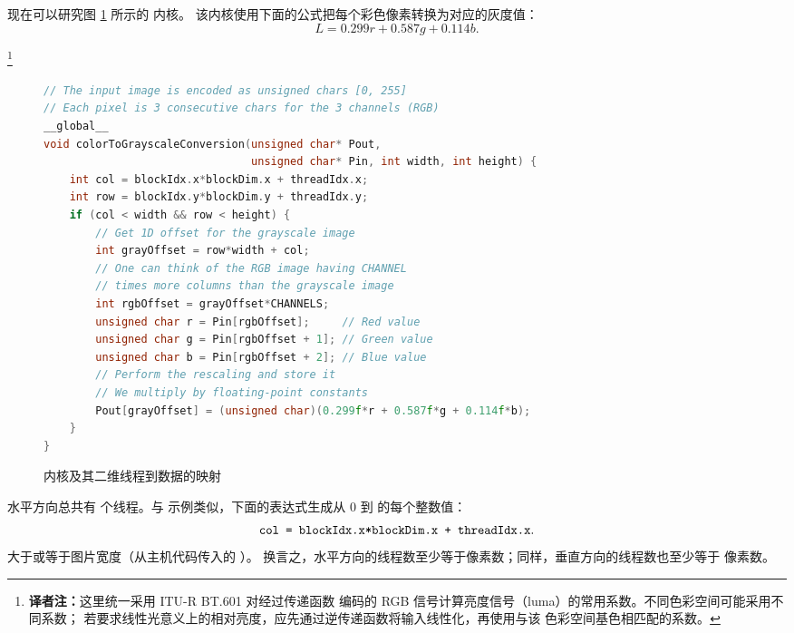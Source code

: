 现在可以研究图 \ref{fig:3-4} 所示的  内核。
该内核使用下面的公式把每个彩色像素转换为对应的灰度值：
\[
  L = 0.299r + 0.587g + 0.114b.
\]

\footnote{\noindent\textbf{译者注：}这里统一采用 ITU-R BT.601 对经过传递函数
编码的 RGB 信号计算亮度信号（luma）的常用系数。不同色彩空间可能采用不同系数；
若要求线性光意义上的相对亮度，应先通过逆传递函数将输入线性化，再使用与该
色彩空间基色相匹配的系数。}

\begin{figure}[htbp]
  \centering
  \begin{lstlisting}[language=C++]
// The input image is encoded as unsigned chars [0, 255]
// Each pixel is 3 consecutive chars for the 3 channels (RGB)
__global__
void colorToGrayscaleConversion(unsigned char* Pout,
                                unsigned char* Pin, int width, int height) {
    int col = blockIdx.x*blockDim.x + threadIdx.x;
    int row = blockIdx.y*blockDim.y + threadIdx.y;
    if (col < width && row < height) {
        // Get 1D offset for the grayscale image
        int grayOffset = row*width + col;
        // One can think of the RGB image having CHANNEL
        // times more columns than the grayscale image
        int rgbOffset = grayOffset*CHANNELS;
        unsigned char r = Pin[rgbOffset];     // Red value
        unsigned char g = Pin[rgbOffset + 1]; // Green value
        unsigned char b = Pin[rgbOffset + 2]; // Blue value
        // Perform the rescaling and store it
        // We multiply by floating-point constants
        Pout[grayOffset] = (unsigned char)(0.299f*r + 0.587f*g + 0.114f*b);
    }
}
  \end{lstlisting}
  \caption{ 内核及其二维线程到数据的映射}
  \label{fig:3-4}
\end{figure}

水平方向总共有  个线程。与 
示例类似，下面的表达式生成从 0 到
 的每个整数值：
\[
  \code{col = blockIdx.x*blockDim.x + threadIdx.x}.
\]
 大于或等于图片宽度（从主机代码传入的 ）。
换言之，水平方向的线程数至少等于像素数；同样，垂直方向的线程数也至少等于
像素数。

